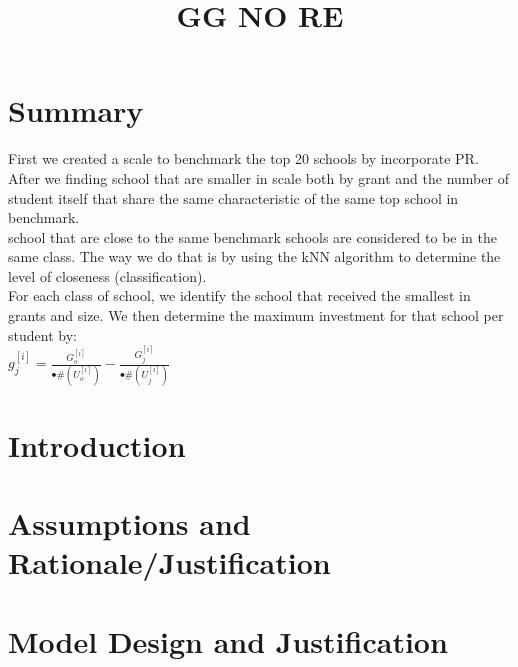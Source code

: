\documentclass[12pt]{article}
\title{GG NO RE}
\begin{document}
\maketitle

\setcounter{page}{1}
\section*{Summary}
\thispagestyle{empty}
First we created a scale to benchmark the top 20 schools by incorporate PR. After we finding school that are smaller in scale both by grant and the number of student itself that share the same characteristic of the same top school in benchmark. \\

school that are close to the same benchmark schools are considered to be in the same class. The way we do that is by using the kNN algorithm to determine the level of closeness (classification). \\ 

For each class of school, we identify the school that received the smallest in grants and size. We then determine the maximum investment for that school per student by: \\
 $g_j^{[i]} = \frac{G_o^{[i]}}{•\#(U_o^{[i]})} - \frac{G_j^{[i]}}{•\#(U_j^{[i]})}$ \\ 
 
 
 




\section{Introduction}


\clearpage
\section{Assumptions and Rationale/Justification}

\clearpage
\section{Model Design and Justification} 
\end{document}
